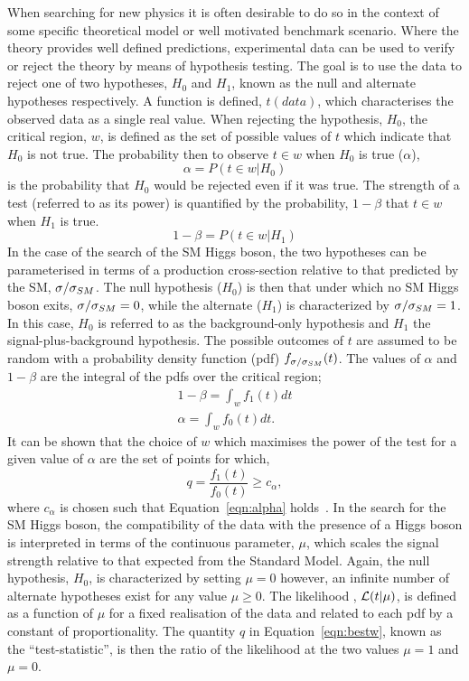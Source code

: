 When searching for new physics it is often desirable to do so in the context of
some specific theoretical model or well motivated benchmark scenario.
Where the theory provides well defined predictions,
experimental data can be used to verify or reject the theory
by means of hypothesis testing. The goal is to use the data 
to reject one of two hypotheses,
$H_{0}$ and $H_{1}$, known as the null and alternate hypotheses
respectively. A function is defined, $t(data)$,
which characterises the observed data as a single real value. When rejecting 
the hypothesis, $H_{0}$, the critical
region, $w$, is defined as the set of possible values of $t$
which indicate that $H_{0}$ is not true. The probability then 
to observe $t\in w$ when $H_{0}$ is true ($\alpha$), 
\begin{equation}
\alpha = P(t\in w|H_{0})
\end{equation}
is the probability that $H_{0}$ would be rejected even if it was true.
The strength of a test (referred to as its power) is quantified by 
the probability, $1-\beta$ that $t \in  w$ when $H_{1}$ is true.
\begin{equation}
1-\beta = P(t\in w|H_{1})
\end{equation}
In the case of the search of the SM Higgs boson, the two hypotheses
can be parameterised in terms of a production cross-section relative
to that predicted by the SM, $\sigma/\sigma_{SM}$.  
The null hypothesis ($H_{0}$) is then that under which no SM Higgs boson exits,
$\sigma/\sigma_{SM}=0$, while the alternate ($H_{1}$) is characterized by $\sigma/\sigma_{SM}=1$.
In this case, $H_{0}$ is referred to as the background-only hypothesis
and $H_{1}$ the signal-plus-background hypothesis.
The possible outcomes of $t$ are assumed to be random with a probability density
function (pdf) $f_{\sigma/\sigma_{SM}}(t)$. The values of $\alpha$ and $1-\beta$ are the integral of the pdfs
over the critical region;
\begin{eqnarray}
1-\beta =  \int_{w}f_{1}(t)dt\\ 
\alpha =  \int_{w}f_{0}(t)dt.
\label{eqn:alpha}
\end{eqnarray}
It can be shown that the choice of $w$ which maximises the power of the test for 
a given value of $\alpha$ are the set of points for which,
\begin{equation} 
	q = \frac {\displaystyle f_{1}(t)}{\displaystyle f_{0}(t)} \ge c_{\alpha},
\label{eqn:bestw}
\end{equation}
where $c_{\alpha}$ is chosen such that Equation~\ref{eqn:alpha} holds~\citep{statsbook}.
In the search for the SM Higgs boson, the compatibility of the data
with the presence of a Higgs boson is interpreted in terms of the 
continuous parameter, $\mu$, which scales the signal strength relative to that expected
from the Standard Model. 
Again, the null hypothesis, $H_{0}$, is characterized by setting $\mu=0$ however,
an infinite number of alternate hypotheses exist for any value $\mu \ge 0$.
The likelihood , $\mathcal{L}(t|\mu)$, is defined as a function of $\mu$ for a fixed 
realisation of the data and related to each pdf by a constant of proportionality.
The quantity $q$ in Equation~\ref{eqn:bestw}, known as the ``test-statistic'', is then
the ratio of the likelihood at the two values $\mu=1$ and $\mu=0$. 

